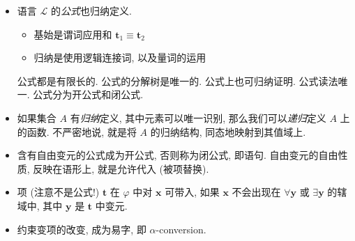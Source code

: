 \documentclass[a4paper]{article}
\begin{document}
\begin{itemize}
\item 语言 $\mathcal{L}$ 的\emph{公式}也归纳定义. \begin{itemize}
    \item 基始是谓词应用和 $\mathbf{t}_1 \equiv \mathbf{t}_2$
    \item 归纳是使用逻辑连接词, 以及量词的运用
    \end{itemize}
    公式都是有限长的. 公式的分解树是唯一的. 公式上也可归纳证明.
    公式读法唯一. 公式分为开公式和闭公式.

\item 如果集合 $A$ 有\emph{归纳}定义, 其中元素可以唯一识别, 那么我们可以\emph{递归}定义 $A$ 上的函数.
    不严密地说, 就是将 $A$ 的归纳结构, 同态地映射到其值域上.

\item 含有自由变元的公式成为开公式, 否则称为闭公式, 即语句.
    自由变元的自由性质, 反映在语形上, 就是允许代入 (被项替换).

\item 项 (注意不是公式!) $\mathbf{t}$ 在 $\varphi$ 中对 $\mathbf{x}$ 可带入, 如果 $\mathbf{x}$ 不会出现在 $\forall \mathbf{y}$ 或 $\exists \mathbf{y}$ 的辖域中, 其中 $\mathbf{y}$ 是 $\mathbf{t}$ 中变元.

\item 约束变项的改变, 成为易字, 即 $\alpha$-conversion.
\end{itemize}
\end{document}

